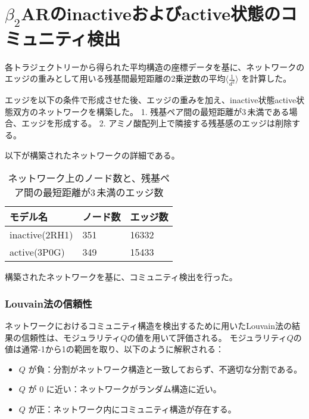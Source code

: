 \newpage


\section{$\beta_2$ARのinactiveおよびactive状態のコミュニティ検出}

各トラジェクトリーから得られた平均構造の座標データを基に、ネットワークのエッジの重みとして用いる残基間最短距離の2乗逆数の平均$\langle \frac{1}{d^2} \rangle$ を計算した。

エッジを以下の条件で形成させた後、エッジの重みを加え、inactive状態active状態双方のネットワークを構築した。
1. 残基ペア間の最短距離が3\,\text{\AA}未満である場合、エッジを形成する。
2. アミノ酸配列上で隣接する残基感のエッジは削除する。

以下が構築されたネットワークの詳細である。
\begin{table}[!ht]
    \centering
    \caption{ネットワーク上のノード数と、残基ペア間の最短距離が3\,\text{\AA}未満のエッジ数}
    \begin{tabular}{lll}
      \hline
      モデル名          & ノード数  & エッジ数 \\
      \hline 
      inactive(2RH1)  &  351 &  16332 \\ 
      active(3P0G)    &  349 &  15433 \\ 
    \end{tabular}
    \label{tab:network_size}
  \end{table}

構築されたネットワークを基に、コミュニティ検出を行った。
\subsubsection{Louvain法の信頼性}

ネットワークにおけるコミュニティ構造を検出するために用いたLouvain法の結果の信頼性は、モジュラリティ$Q$の値を用いて評価される。
モジュラリティ$Q$の値は通常-1から1の範囲を取り、以下のように解釈される：

\begin{itemize}
    \item \( Q \) が負：分割がネットワーク構造と一致しておらず、不適切な分割である。
    \item \( Q \) が 0 に近い：ネットワークがランダム構造に近い。
    \item \( Q \) が正：ネットワーク内にコミュニティ構造が存在する。
\end{itemize}


